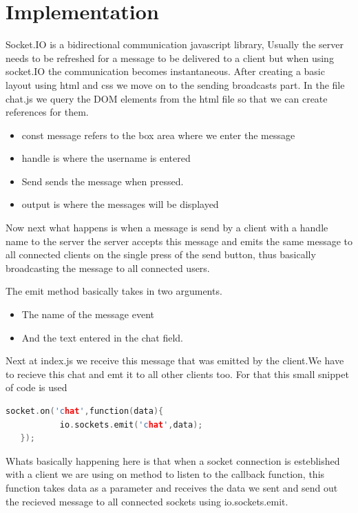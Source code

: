 \documentclass{fisatproject}
\begin{document}
\section{Implementation}
    Socket.IO is a bidirectional communication javascript library, Usually the server needs to be refreshed for a message to be delivered to a client but when using socket.IO the communication becomes instantaneous.
	After creating a basic layout using html and css we move on to the sending broadcasts part. In the file chat.js we query the DOM elements from the html file so that we can create references for them.
	\begin{itemize}
	    \item const message refers to the box area where we enter the message
	    \item handle is where the username is entered
	    \item Send sends the message when pressed.
	    \item output is where the messages will be displayed
	\end{itemize}
\vspace{1cm}

Now next what happens is when a message is send by a client with a handle name to the server the server accepts this message and emits the same message to all connected clients on the single press of the send button, thus basically broadcasting the message to all connected users.

The emit method basically takes in two arguments.

    \begin{itemize}
	    \item The name of the message event
	    \item And the text entered in the chat field.

	\end{itemize}
	
	Next at index.js we receive this message that was emitted by the client.We have to recieve this chat and emt it to all other clients too. For that this small snippet of code is used
	\begin{lstlisting}[language=c++]
	socket.on('chat',function(data){
           io.sockets.emit('chat',data);
   });
   \end{lstlisting}
    \vspace{1cm}
    Whats basically happening here is that when a socket connection is esteblished with a client we are using on method to listen to the callback function, this function takes data as a parameter and receives the data we sent and send out the recieved message to all connected sockets using io.sockets.emit.
    
\end{document}
